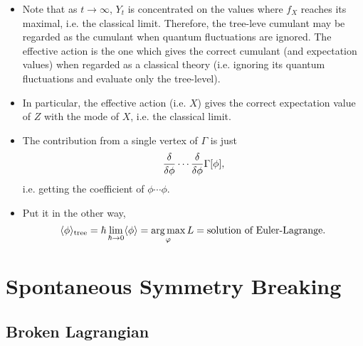 \documentclass{article}
\begin{document}
\begin{itemize}
    \item Note that as $t\rightarrow\infty$, $Y_t$ is concentrated on the values where $f_X$ reaches its maximal, i.e. the classical limit.
    Therefore, the tree-leve cumulant may be regarded as the cumulant when quantum fluctuations are ignored.
    The effective action is the one which gives the correct cumulant (and expectation values) when regarded as a classical theory (i.e. ignoring its quantum fluctuations and evaluate only the tree-level).
    \item In particular, the effective action (i.e. $X$) gives the correct expectation value of $Z$ with the mode of $X$, i.e. the classical limit.
    \item The contribution from a single vertex of $\Gamma$ is just
    \[ \fdv{\phi}\cdots \fdv{\phi}\Gamma[\phi], \]
    i.e. getting the coefficient of $\phi \cdots \phi$.
    \item Put it in the other way,
    \[ \langle \phi \rangle_{\text{tree}} = 
    \hbar \lim_{\hbar\rightarrow 0} \langle \phi \rangle = \operatorname*{arg\,max}_{\varphi} L = \text{solution of Euler-Lagrange}. \]
\end{itemize}

\section{Spontaneous Symmetry Breaking}

\subsection{Broken Lagrangian}
\end{document}
